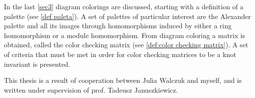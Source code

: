In the last \cref{sec3} diagram colorings are discussed, starting with a definition of a palette (see \cref{def paleta}). A set of palettes of particular interest are the Alexander palette and all its images through homomorphisms induced by either a ring homomorphism or a module homomorphism. From diagram coloring a matrix is obtained, called the color checking matrix (see \cref{def:color checking matrix}). A set of criteria that must be met in order for color checking matrices to be a knot invariant is presented.

This thesis is a result of cooperation between Julia Walczuk and myself, and is written under supervision of prof. Tadeusz Januszkiewicz.

 
